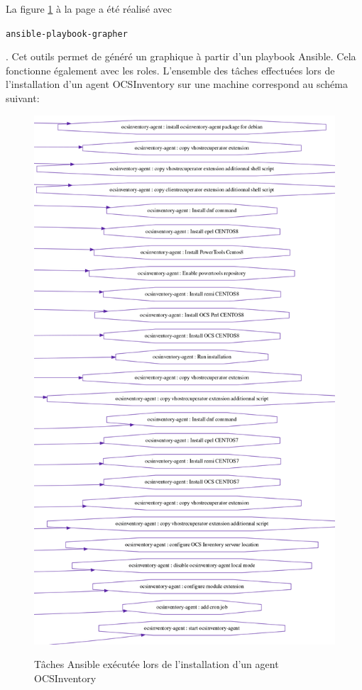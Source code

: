 \documentclass[12pt]{article}
\begin{document}
La figure \ref{fig:fonctionnement_roles_ocs} à la page \pageref{fig:fonctionnement_roles_ocs} a été réalisé avec \begin{code}\texttt{ansible-playbook-grapher}\end{code}.
Cet outils permet de généré un graphique à partir d'un playbook \gls{Ansible}.
Cela fonctionne également avec les roles.
L'ensemble des tâches effectuées lors de l'installation d'un agent \gls{OCSInventory} sur une machine correspond au schéma suivant:
\begin{figure}[!ht]
    \centering
    \includegraphics[scale=0.43]{src/fonctionnement_roles_ocs.png}
    \label{fig:fonctionnement_roles_ocs}
    \caption{Tâches \gls{Ansible} exécutée lors de l'installation d'un agent \gls{OCSInventory}}
\end{figure}
\end{document}
